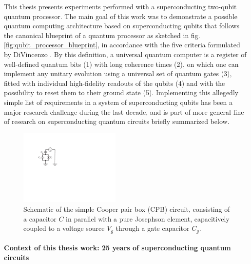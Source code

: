 This thesis presents experiments performed with a superconducting
two-qubit quantum processor. The main goal of this work was to demonstrate
a possible quantum computing architecture based on superconducting
qubits that follows the canonical blueprint of a quantum processor
as sketched in fig. \ref{fig:qubit_processor_blueprint},
in accordance with the five criteria formulated by DiVincenzo \citep{divincenzo_physical_2000}.
By this definition, a universal quantum computer is a register of
well-defined quantum bits (1) with long coherence times (2),
on which one can implement any unitary evolution using a universal
set of quantum gates (3), fitted with individual high-fidelity readouts
of the qubits (4) and with the possibility to reset them to their ground state (5). Implementing this allegedly simple list of requirements
in a system of superconducting qubits has been a major research challenge
during the last decade, and is part of more general line of research
on superconducting quantum circuits briefly summarized below.

%
\begin{figure}
 \centering \includegraphics[width=5cm]{./material/figures/introduction/cooper_pair_box_simple}
\caption[]{Schematic of the simple Cooper pair box (CPB) circuit, consisting
of a capacitor $C$ in parallel with a pure Josephson element, capacitively
coupled to a voltage source $V_g$ through a gate capacitor $C_g$.}
\label{fig:cooper_pair_box_simple} %
\end{figure}



\paragraph{Context of this thesis work: 25 years of superconducting
quantum circuits}

